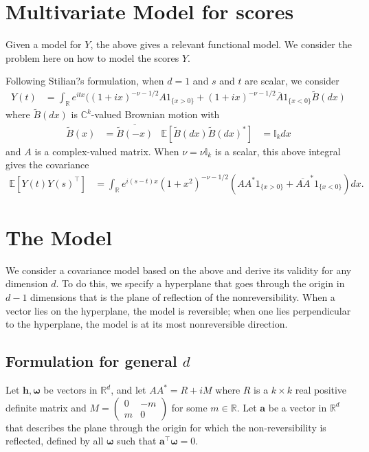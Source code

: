 \documentclass[11pt]{article}
\newcommand{\vlen}{\boldsymbol{h}}
\newcommand{\vint}{\boldsymbol{\omega}}
\newcommand{\vpla}{\boldsymbol{a}}
\begin{document}
\section{Multivariate Model for scores}

Given a model for $Y$, the above gives a relevant functional model. We consider the problem here on how to model the scores $Y$. 

Following Stilian?s formulation, when $d=1$ and $s$ and $t$ are scalar, we consider \begin{align*}
Y(t) &= \int_\mathbb{R}e^{itx}((1 + ix)^{-\nu - 1/2} A1_{\{x > 0\}} + (1 + ix)^{-\nu - 1/2} \overline{A}1_{\{x < 0\}}\tilde{B} (dx)
\end{align*}where $\tilde{B}(dx)$ is $\mathbb{C}^k$-valued Brownian motion with \begin{align*}
\tilde{B}(x) &= \overline{\tilde{B}(-x)} &  \mathbb{E}[\tilde{B}(dx) \tilde{B}(dx)^*] &= \mathbb{I}_k dx
\end{align*}and $A$ is a complex-valued matrix. When $\nu = \nu \mathbb{I}_k$ is a scalar, this above integral gives the covariance \begin{align*}
\mathbb{E}[ Y(t) Y(s)^\top ] &= \int_{\mathbb{R}} e^{i(s-t)x}(1+x^2)^{-\nu-1/2}(AA^*1_{\{x >0\}} + \overline{AA}^*1_{\{x < 0\}})dx.
\end{align*}

\section{The Model}

We consider a covariance model based on the above and derive its validity for any dimension $d$. To do this, we specify a hyperplane that goes through the origin in $d-1$ dimensions that is the plane of reflection of the nonreversibility. When a vector lies on the hyperplane, the model is reversible; when one lies perpendicular to the hyperplane, the model is at its most nonreversible direction. %

\subsection{Formulation for general $d$}

Let $ \vlen, \vint$ be vectors in $\mathbb{R}^d$, and let $AA^* = R + iM$ where $R$ is a $k\times k$ real positive definite matrix and $M = \begin{pmatrix} 0 & -m\\  m & 0\end{pmatrix}$ for some $m \in \mathbb{R}$. Let $\vpla$ be a vector in $\mathbb{R}^d$ that describes the plane through the origin for which the non-reversibility is reflected, defined by all $\vint$ such that $\vpla^\top \vint = 0$.
\end{document}
